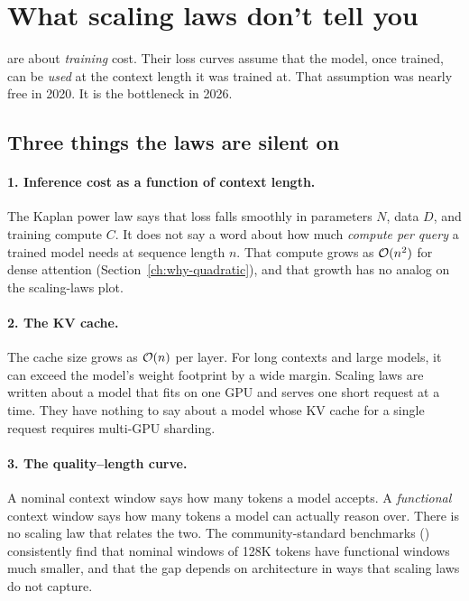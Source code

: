 \section{What scaling laws don't tell you}
\label{ch:what-scaling-omits}

 are about \emph{training} cost. Their
loss curves assume that the model, once trained, can be \emph{used} at the
context length it was trained at. That assumption was nearly free in 2020.
It is the bottleneck in 2026.

\subsection{Three things the laws are silent on}

\paragraph{1. Inference cost as a function of context length.} The Kaplan
power law says that loss falls smoothly in parameters \(N\), data \(D\), and
training compute \(C\). It does not say a word about how much \emph{compute
per query} a trained model needs at sequence length \(n\). That compute
grows as \(\mathcal{O}(n^2)\) for dense attention (Section~\ref{ch:why-quadratic}),
and that growth has no analog on the scaling-laws plot.

\paragraph{2. The KV cache.} The cache size grows as \(\mathcal{O}(n)\) per layer.
For long contexts and large models, it can exceed the model's weight footprint
by a wide margin. Scaling laws are written about a model that fits on one
GPU and serves one short request at a time. They have nothing to say about
a model whose KV cache for a single request requires multi-GPU sharding.

\paragraph{3. The quality--length curve.} A nominal context window says how
many tokens a model accepts. A \emph{functional} context window says how
many tokens a model can actually reason over. There is no scaling law that
relates the two. The community-standard benchmarks
(\citealp{hsieh2024ruler, chen2025mrcr}) consistently find that nominal
windows of 128K tokens have functional windows much smaller, and that the
gap depends on architecture in ways that scaling laws do not capture.

